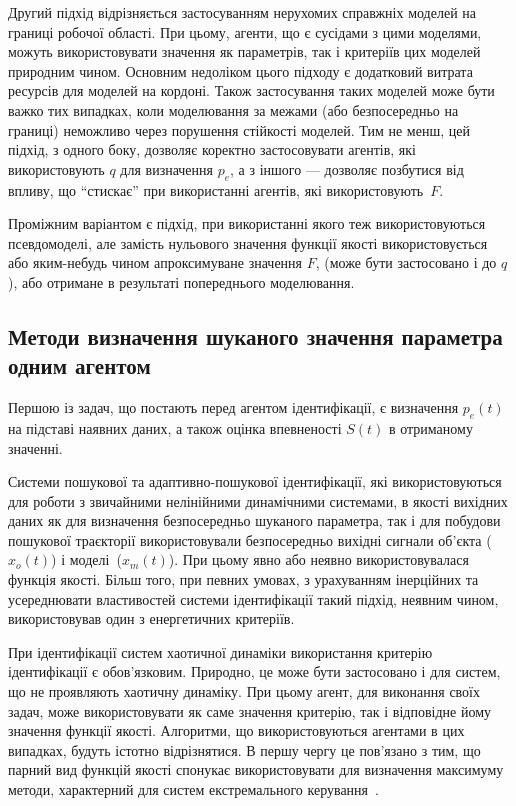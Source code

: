 Другий підхід відрізняється застосуванням нерухомих
справжніх моделей на границі робочої області. При цьому,
агенти, що є сусідами з цими моделями, можуть використовувати
значення як параметрів, так і критеріїв цих моделей природним
чином. Основним недоліком цього підходу є додатковий витрата
ресурсів для моделей на кордоні. Також застосування таких
моделей може бути важко тих випадках, коли моделювання за межами
(або безпосередньо на границі) неможливо через порушення
стійкості моделей. Тим не менш, цей підхід, з одного боку,
дозволяє коректно застосовувати агентів, які використовують
$q$ для визначення $p_e$,
а з іншого --- дозволяє позбутися від впливу, що ``стискає'' при
використанні агентів, які використовують~$F$.

Проміжним варіантом є підхід, при використанні якого
теж використовуються псевдомоделі, але замість нульового
значення функції якості використовується або яким-небудь чином
апроксимуване значення
$ F $, (може бути застосовано і до $q$),
або отримане в результаті попереднього моделювання.




\subsection{Методи визначення шуканого значення параметра одним агентом} %

Першою із задач, що постають перед агентом ідентифікації, є визначення $p_e(t)$
на підставі наявних даних, а також оцінка впевненості $S(t)$ в
отриманому значенні.

Системи пошукової та адаптивно-пошукової ідентифікації,
які використовуються для роботи з звичайними нелінійними
динамічними системами, в якості вихідних даних як для визначення
безпосередньо шуканого параметра, так і для побудови пошукової
траєкторії використовували безпосередньо вихідні сигнали
об'єкта ($x_o(t)$) і моделі~($x_m(t)$).
При цьому явно або неявно використовувалася функція
якості. Більш того, при певних умовах, з урахуванням інерційних
та усереднювати властивостей системи ідентифікації такий
підхід, неявним чином, використовував один з енергетичних
критеріїв.

При ідентифікації систем хаотичної динаміки використання
критерію ідентифікації є обов'язковим. Природно, це може
бути застосовано і для систем, що не проявляють хаотичну
динаміку. При цьому агент, для виконання своїх задач, може
використовувати як саме значення критерію, так і відповідне
йому значення функції якості. Алгоритми, що використовуються
агентами в цих випадках, будуть істотно відрізнятися. В першу
чергу це пов'язано з тим, що парний вид функцій якості спонукає
використовувати для визначення максимуму методи, характерний
для систем екстремального керування~\cite{rastr_seu}.

